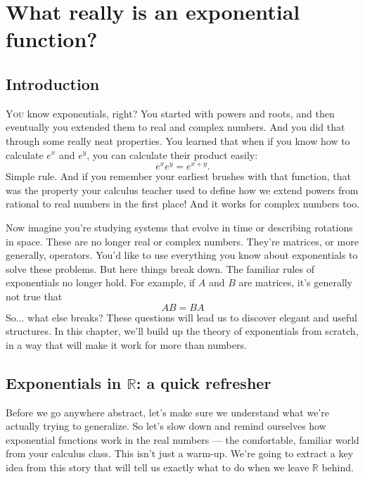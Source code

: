 \chapter{What really is an exponential function?}

\section{Introduction}

\lettrine{Y}{ou} know exponentials, right? You started with powers and roots, and then eventually you extended them to real and complex numbers. And you did that through some really neat properties. You learned that when if you know how to calculate $e^x$ and $e^y$, you can calculate their product easily:
\begin{equation}
    e^{x}e^{y} = e^{x + y}.
\end{equation}
Simple rule. And if you remember your earliest brushes with that function, that was the property your calculus teacher used to define how we extend powers from rational to real numbers in the first place! And it works for complex numbers too.

Now imagine you're studying systems that evolve in time or describing rotations in space. These are no longer real or complex numbers. They're matrices, or more generally, operators. You'd like to use everything you know about exponentials to solve these problems. But here things break down. The familiar rules of exponentials no longer hold. For example, if $A$ and $B$ are matrices, it's generally not true that
\begin{equation}
    AB = BA
\end{equation}
So... what else breaks? These questions will lead us to discover elegant and useful structures. In this chapter, we'll build up the theory of exponentials from scratch, in a way that will make it work for more than numbers.

\section{Exponentials in $\mathbb{R}$: a quick refresher}

Before we go anywhere abstract, let's make sure we understand what we're actually trying to generalize. So let's slow down and remind ourselves how exponential functions work in the real numbers --- the comfortable, familiar world from your calculus class. This isn't just a warm-up. We're going to extract a key idea from this story that will tell us exactly what to do when we leave $\mathbb{R}$ behind.


